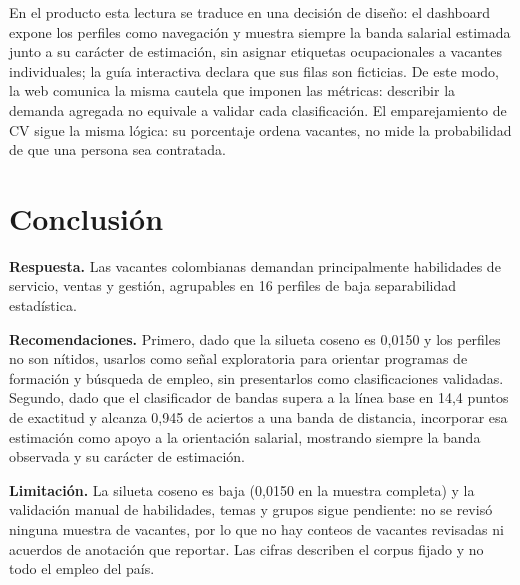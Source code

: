 \documentclass[journal]{IEEEtran}
\begin{document}
En el producto esta lectura se traduce en una decisión de diseño: el dashboard expone los perfiles como navegación y muestra siempre la banda salarial estimada junto a su carácter de estimación, sin asignar etiquetas ocupacionales a vacantes individuales; la guía interactiva declara que sus filas son ficticias. De este modo, la web comunica la misma cautela que imponen las métricas: describir la demanda agregada no equivale a validar cada clasificación. El emparejamiento de CV sigue la misma lógica: su porcentaje ordena vacantes, no mide la probabilidad de que una persona sea contratada.

\section{Conclusión}
\textbf{Respuesta.} Las vacantes colombianas demandan principalmente habilidades de servicio, ventas y gestión, agrupables en 16 perfiles de baja separabilidad estadística.

\textbf{Recomendaciones.} Primero, dado que la silueta coseno es 0,0150 y los perfiles no son nítidos, usarlos como señal exploratoria para orientar programas de formación y búsqueda de empleo, sin presentarlos como clasificaciones validadas. Segundo, dado que el clasificador de bandas supera a la línea base en 14,4 puntos de exactitud y alcanza 0,945 de aciertos a una banda de distancia, incorporar esa estimación como apoyo a la orientación salarial, mostrando siempre la banda observada y su carácter de estimación.

\textbf{Limitación.} La silueta coseno es baja (0,0150 en la muestra completa) y la validación manual de habilidades, temas y grupos sigue pendiente: no se revisó ninguna muestra de vacantes, por lo que no hay conteos de vacantes revisadas ni acuerdos de anotación que reportar. Las cifras describen el corpus fijado y no todo el empleo del país.
\end{document}

